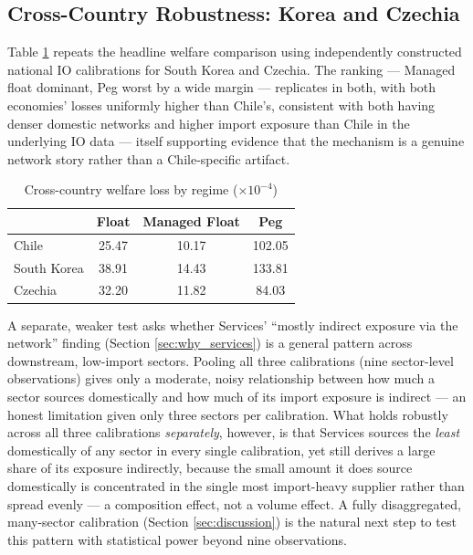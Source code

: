 \documentclass[12pt]{article}
\begin{document}
\subsection{Cross-Country Robustness: Korea and Czechia}
\label{sec:crosscountry}

Table \ref{tab:crosscountry} repeats the headline welfare comparison using independently constructed
national IO calibrations for South Korea and Czechia. The ranking --- Managed float dominant, Peg
worst by a wide margin --- replicates in both, with both economies' losses uniformly higher than
Chile's, consistent with both having denser domestic networks and higher import exposure than Chile
in the underlying IO data --- itself supporting evidence that the mechanism is a genuine network
story rather than a Chile-specific artifact.

\begin{table}[H]
\centering
\caption{Cross-country welfare loss by regime ($\times10^{-4}$)}
\label{tab:crosscountry}
\begin{tabular}{lccc}
\toprule
 & Float & Managed Float & Peg \\
\midrule
Chile & 25.47 & 10.17 & 102.05 \\
South Korea & 38.91 & 14.43 & 133.81 \\
Czechia & 32.20 & 11.82 & 84.03 \\
\bottomrule
\end{tabular}
\end{table}

A separate, weaker test asks whether Services' ``mostly indirect exposure via the network'' finding
(Section \ref{sec:why_services}) is a general pattern across downstream, low-import sectors. Pooling
all three calibrations (nine sector-level observations) gives only a moderate, noisy relationship
between how much a sector sources domestically and how much of its import exposure is indirect --- an
honest limitation given only three sectors per calibration. What holds robustly across all three
calibrations \emph{separately}, however, is that Services sources the \emph{least} domestically of any
sector in every single calibration, yet still derives a large share of its exposure indirectly,
because the small amount it does source domestically is concentrated in the single most import-heavy
supplier rather than spread evenly --- a composition effect, not a volume effect. A fully
disaggregated, many-sector calibration (Section \ref{sec:discussion}) is the natural next step to test
this pattern with statistical power beyond nine observations.
\end{document}
